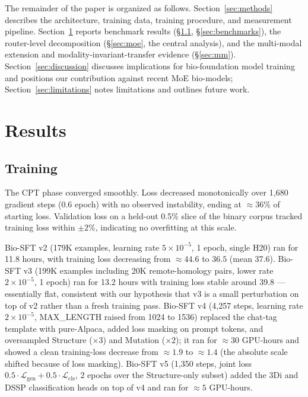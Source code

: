 \documentclass[11pt]{article}
\begin{document}
The remainder of the paper is organized as follows. Section~\ref{sec:methods} describes the architecture, training data, training procedure, and measurement pipeline. Section~\ref{sec:results} reports benchmark results (\S\ref{sec:training}, \S\ref{sec:benchmarks}), the router-level decomposition (\S\ref{sec:moe}, the central analysis), and the multi-modal extension and modality-invariant-transfer evidence (\S\ref{sec:mm}). Section~\ref{sec:discussion} discusses implications for bio-foundation model training and positions our contribution against recent MoE bio-models; Section~\ref{sec:limitations} notes limitations and outlines future work.




\section{Results}
\label{sec:results}

\subsection{Training}
\label{sec:training}

The CPT phase converged smoothly. Loss decreased monotonically over 1{,}680 gradient steps (0.6 epoch) with no observed instability, ending at $\approx 36\%$ of starting loss. Validation loss on a held-out 0.5\% slice of the binary corpus tracked training loss within $\pm 2\%$, indicating no overfitting at this scale.

Bio-SFT v2 (179K examples, learning rate $5 \times 10^{-5}$, 1 epoch, single H20) ran for 11.8 hours, with training loss decreasing from $\approx 44.6$ to $36.5$ (mean 37.6). Bio-SFT v3 (199K examples including 20K remote-homology pairs, lower rate $2 \times 10^{-5}$, 1 epoch) ran for 13.2 hours with training loss stable around 39.8 --- essentially flat, consistent with our hypothesis that v3 is a small perturbation on top of v2 rather than a fresh training pass. Bio-SFT v4 (4{,}257 steps, learning rate $2 \times 10^{-5}$, MAX\_LENGTH raised from 1024 to 1536) replaced the chat-tag template with pure-Alpaca, added loss masking on prompt tokens, and oversampled Structure ($\times 3$) and Mutation ($\times 2$); it ran for $\approx 30$ GPU-hours and showed a clean training-loss decrease from $\approx 1.9$ to $\approx 1.4$ (the absolute scale shifted because of loss masking). Bio-SFT v5 (1{,}350 steps, joint loss $0.5 \cdot \mathcal{L}_{\text{gen}} + 0.5 \cdot \mathcal{L}_{\text{cls}}$, 2 epochs over the Structure-only subset) added the 3Di and DSSP classification heads on top of v4 and ran for $\approx 5$ GPU-hours.
\end{document}
